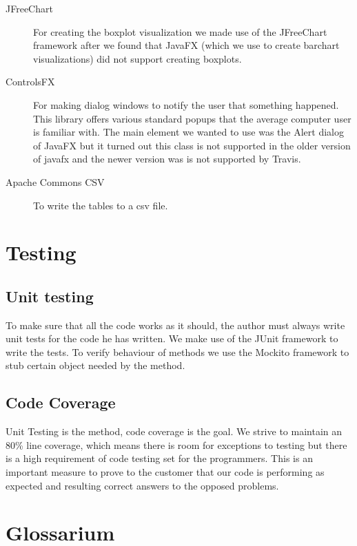 \documentclass[a4paper]{article}
\begin{document}
\begin{description}
\item[JFreeChart] For creating the boxplot visualization we made use of the JFreeChart framework
after we found that JavaFX (which we use to create barchart visualizations) did not support creating boxplots.

\item[ControlsFX] For making dialog windows to notify the user that something happened.
This library offers various standard popups that the average computer user is familiar with.
The main element we wanted to use was the Alert dialog of JavaFX but it turned out this class 
is not supported in the older version of javafx and the newer version was is not supported by Travis.

\item[Apache Commons CSV] To write the tables to a csv file.


\end{description}

\section{Testing}
\subsection{Unit testing}
To make sure that all the code works as it should, the author must always write
unit tests for the code he has written. We make use of the JUnit framework to
write the tests. To verify behaviour of methods we use the Mockito framework to
stub certain object needed by the method.

\subsection{Code Coverage}
Unit Testing is the method, code coverage is the goal. We strive to maintain an 80\% line coverage, which means there is room for exceptions to testing but there is a high requirement of code testing set for the programmers. This is an important measure to prove to the customer that our code is performing as expected and resulting correct answers to the opposed problems.

\section{Glossarium}
\end{document}
